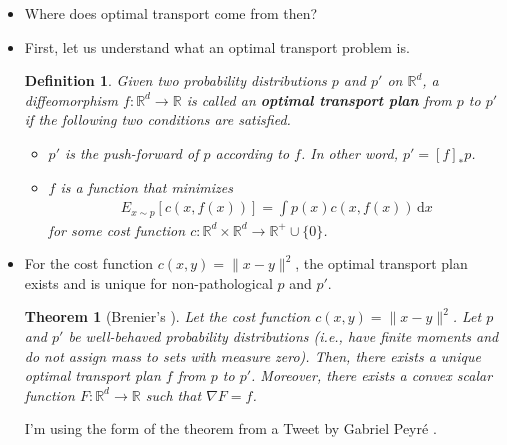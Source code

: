 \documentclass[10pt]{article}
\newtheorem{theorem}[lemma]{Theorem}
\newtheorem{definition}[lemma]{Definition}
\newcommand{\dee}{\mathrm{d}}
\newcommand{\ra}{\rightarrow}
\newcommand{\Real}{\mathbb{R}}
\begin{document}
\begin{itemize}
  \item Where does optimal transport come from then?
  
  \item First, let us understand what an optimal transport problem is.
  
  \begin{definition}
    Given two probability distributions $p$ and $p'$ on $\Real^d$, a diffeomorphism $f: \Real^d \ra \Real$ is called an {\bf optimal transport plan} from $p$ to $p'$ if the following two conditions are satisfied.
    \begin{itemize}
      \item $p'$ is the push-forward of $p$ according to $f$. In other word, $p' = [f]_* p$.
      \item $f$ is a function that minimizes
      \begin{align*}
        E_{x \sim p}[c(x, f(x))] = \int p(x) c(x,f(x))\, \dee x
      \end{align*}
      for some cost function $c: \Real^d \times \Real^d \ra \Real^+ \cup \{0\}$.
    \end{itemize} 
  \end{definition}

  \item For the cost function $c(x,y) = \| x-y \|^2$, the optimal transport plan exists and is unique for non-pathological $p$ and $p'$.
  \begin{theorem}[Brenier's \cite{Brenier:1991}]
    Let the cost function $c(x,y) = \| x-y \|^2$. Let $p$ and $p'$ be well-behaved probability distributions (i.e., have finite moments and do not assign mass to sets with measure zero). Then, there exists a unique optimal transport plan $f$ from $p$ to $p'$. Moreover, there exists a convex scalar function $F:\Real^d \ra \Real$ such that $\nabla F = f$.
  \end{theorem}
  I'm using the form of the theorem from a Tweet by Gabriel Peyr\'{e} \cite{Peyre:BreinerTheoremTweet}.


\end{itemize}
\end{document}
